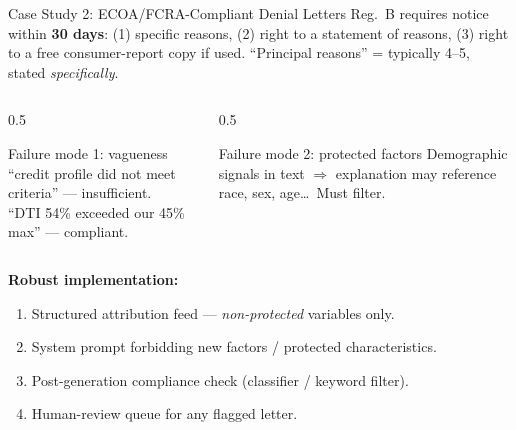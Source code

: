 \documentclass[9pt,t]{beamer}
\begin{document}
\begin{frame}{Case Study 2: ECOA/FCRA-Compliant Denial Letters}
Reg.\ B requires notice within \textbf{30 days}: (1) specific reasons,
(2) right to a statement of reasons, (3) right to a free consumer-report copy if
used. ``Principal reasons'' = typically 4--5, stated \emph{specifically}.

\medskip
\begin{columns}[T]
\begin{column}{0.5\textwidth}
\begin{alertblock}{Failure mode 1: vagueness}
``credit profile did not meet criteria'' --- insufficient.\\
``DTI 54\% exceeded our 45\% max'' --- compliant.
\end{alertblock}
\end{column}
\begin{column}{0.5\textwidth}
\begin{alertblock}{Failure mode 2: protected factors}
Demographic signals in text $\Rightarrow$ explanation may reference race,
sex, age\ldots\ Must filter.
\end{alertblock}
\end{column}
\end{columns}

\medskip
\textbf{Robust implementation:}
\begin{enumerate}\small
  \item Structured attribution feed --- \emph{non-protected} variables only.
  \item System prompt forbidding new factors / protected characteristics.
  \item Post-generation compliance check (classifier / keyword filter).
  \item Human-review queue for any flagged letter.
\end{enumerate}
\end{frame}
\end{document}
